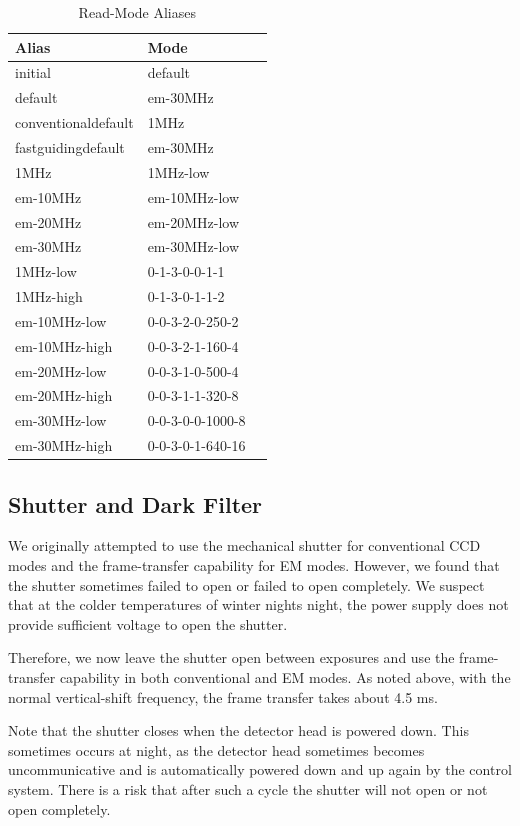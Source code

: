 \begin{table}
\caption{Read-Mode Aliases}
\label{table:read-mode-aliases}
\begin{center}
\begin{tabular}{lll}
\hline
Alias&Mode\\
\hline
 initial&default\\
 default&em-30MHz\\
 conventionaldefault&1MHz\\
 fastguidingdefault&em-30MHz\\
 1MHz&1MHz-low\\
 em-10MHz&em-10MHz-low\\
 em-20MHz&em-20MHz-low\\
 em-30MHz&em-30MHz-low\\
 1MHz-low&0-1-3-0-0-1-1\\
 1MHz-high&0-1-3-0-1-1-2\\
 em-10MHz-low&0-0-3-2-0-250-2\\
 em-10MHz-high&0-0-3-2-1-160-4\\
 em-20MHz-low&0-0-3-1-0-500-4\\
 em-20MHz-high&0-0-3-1-1-320-8\\
 em-30MHz-low&0-0-3-0-0-1000-8\\
 em-30MHz-high&0-0-3-0-1-640-16\\
 \hline
\end{tabular}
\end{center}
\end{table}

\subsection{Shutter and Dark Filter}

\label{section:shutter}

We originally attempted to use the mechanical shutter for conventional CCD modes and the frame-transfer capability for EM modes. However, we found that the shutter sometimes failed to open or failed to open completely. We suspect that at the colder temperatures of winter nights night, the power supply does not provide sufficient voltage to open the shutter.  

Therefore, we now leave the shutter open between exposures and use the frame-transfer capability in both conventional and EM modes. As noted above, with the normal vertical-shift frequency, the frame transfer takes about 4.5 ms.

Note that the shutter closes when the detector head is powered down. This sometimes occurs at night, as the detector head sometimes becomes uncommunicative and is automatically powered down and up again by the control system. There is a risk that after such a cycle the shutter will not open or not open completely.

